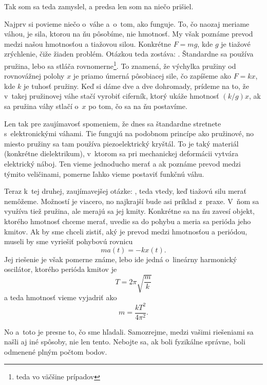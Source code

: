 Tak som sa teda zamyslel, a predsa len som na niečo prišiel.

Najprv si povieme niečo o~váhe a~o~tom, ako funguje.
To, čo naozaj meriame váhou, je sila, ktorou na ňu pôsobíme, nie hmotnosť.
My však poznáme prevod medzi našou hmotnosťou a tiažovou silou.
Konkrétne $F = mg$, kde $g$ je tiažové zrýchlenie, čiže žiaden problém.
Otázkou teda zostáva: .
Štandardne sa používa pružina, lebo sa stláča rovnomerne\footnote{teda vo väčšine prípadov}.
To znamená, že výchylka pružiny od rovnovážnej polohy $x$ je priamo úmerná pôsobiacej sile, čo zapíšeme ako
$F = k x$, kde $k$ je tuhosť pružiny. Keď si dáme dve a dve dohromady, prídeme na to, že 
v~takej pružinovej váhe stačí vyrobiť ciferník, ktorý ukáže hmotnosť $(k/g)x$,
ak sa pružina váhy stlačí o~$x$ po tom, čo sa na ňu postavíme.

Len tak pre zaujímavosť spomeniem, že dnes sa štandardne stretnete s~elektronickými váhami.
Tie fungujú na podobnom princípe ako pružinové, no miesto pružiny sa tam používa piezoelektrický kryštál.
To je taký materiál (konkrétne dielektrikum), v~ktorom sa pri mechanickej deformácii vytvára elektrický náboj.
Ten vieme jednoducho merať a ak poznáme prevod medzi týmito veličinami, pomerne ľahko vieme postaviť funkčnú váhu.

Teraz k~tej druhej, zaujímavejšej otázke: ,
teda vtedy, keď tiažovú silu merať nemôžeme.
Možností je viacero, no najkrajší bude asi príklad z~praxe. V~ňom sa využíva tiež pružina, ale merajú sa jej kmity.
Konkrétne sa na ňu zavesí objekt, ktorého hmotnosť chceme merať, uvedie sa do pohybu a meria sa 
perióda jeho kmitov. Ak by sme chceli zistiť, aký je prevod medzi hmotnosťou a periódou,
museli by sme vyriešiť pohybovú rovnicu
$$m a(t) = -k x(t)\text{.}$$ 
Jej riešenie je však pomerne známe, lebo ide jedná o~lineárny harmonický oscilátor,
ktorého perióda kmitov je
$$T = 2 \pi \sqrt{\frac{m}{k}}$$
a teda hmotnosť vieme vyjadriť ako
$$m = \dfrac{kT^2}{4 \pi^2}\text{.}$$

No a~toto je presne to, čo sme hľadali. Samozrejme, medzi vašimi riešeniami sa našli aj iné spôsoby, nie len tento.
Nebojte sa, ak boli fyzikálne správne, boli odmenené plným počtom bodov.

